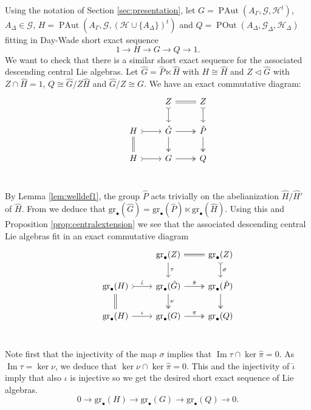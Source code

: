 \documentclass[10pt]{amsart}
\theoremstyle{definition}
\newcommand{\PAut}{\operatorname{PAut}}
\newcommand{\POut}{\operatorname {POut}}
\newcommand{\im}{\operatorname {Im}}
\newcommand{\gr}{\mathrm{gr}_\bullet}
\theoremstyle{definition}
\numberwithin{equation}{section}
\begin{document}
Using the notation of Section \ref{sec:presentation}, let $G=\PAut(A_\Gamma,\mathcal{G},\mathcal{H}^t)$, $A_\Delta\in\mathcal{G}$, $H=\PAut(A_\Gamma,\mathcal{G},(\mathcal{H}\cup\{A_\Delta\})^t)$ and $Q=\POut(A_\Delta,\mathcal{G}_\Delta,\mathcal{H}_\Delta)$ fitting in Day-Wade short exact sequence
\[1\to H\to G\to Q\to 1.\]
We want to check that there is a similar short exact sequence for the associated descending central Lie algebras.
Let
$\hat G=\hat P\ltimes\hat H$ with $H\cong\hat H$ and $Z\triangleleft\hat G$ with $Z\cap\hat H=1$, $Q\cong\hat G/Z\hat H$ and $\hat G/Z\cong G$. We have an exact commutative diagram:
\[
\begin{tikzcd}
&&Z\arrow[r,equal]\arrow[d,rightarrowtail] &Z\arrow[d,rightarrowtail]\\
& H\arrow[r,rightarrowtail]\arrow[d,equal]&\hat G\arrow[r,twoheadrightarrow]\arrow[d,twoheadrightarrow] &\hat P\arrow[d,twoheadrightarrow]\\
&H\arrow[r,rightarrowtail]&G\arrow[r,twoheadrightarrow]&Q\\
\end{tikzcd}
\]


By Lemma \ref{lem:welldef1}, the group $\hat P$ acts trivially on the abelianization $\hat H/\hat H'$ of $\hat H$. From \cite[Theorem~3.1]{FalkRandell} we deduce that $\gr(\hat G)=\gr(\hat P)\ltimes\gr(\hat H)$. Using this and Proposition \ref{prop:centralextension} we see that the associated descending central Lie algebras fit in an exact commutative diagram
\[
\begin{tikzcd}
&&\gr(Z)\arrow[r,equal]\arrow[d,"\tau"]  &\gr(Z)\arrow[d,rightarrowtail,"\sigma"]\\
& \gr(H)\arrow[r,rightarrowtail,"\hat\iota"]\arrow[d,equal]&\gr(\hat G)\arrow[r,twoheadrightarrow,"\hat\pi"]\arrow[d,twoheadrightarrow, "\nu"] &\gr(\hat P)\arrow[d,twoheadrightarrow]\\
&\gr(H)\arrow[r,"\iota"]&\gr(G)\arrow[r,twoheadrightarrow,"\pi"]&\gr(Q)\\
\end{tikzcd}
\]



Note first that the injectivity of the map $\sigma$ implies that $\im\tau\cap\ker\hat\pi=0$. As $\im\tau=\ker\nu$, we deduce that $\ker\nu\cap\ker\hat\pi=0$. This and the injectivity of $\hat\iota$ imply that also $\iota$ is injective so we get the desired short exact sequence of Lie algebras.
\begin{equation}\label{eq:seq}
0\to\gr(H)\to\gr(G)\to\gr(Q)\to 0.\end{equation}
\end{document}

